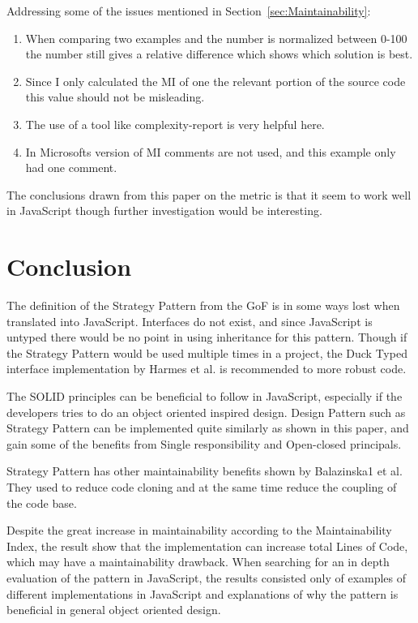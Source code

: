 \documentclass[conference, a4paper]{IEEEtran}
\begin{document}
Addressing some of the issues mentioned in Section~\ref{sec:Maintainability}:
\begin{enumerate}
	\item When comparing two examples and the number is normalized between 0-100 the number still gives a relative difference which shows which solution is best.
	\item Since I only calculated the MI of one the relevant portion of the source code this value should not be misleading.
	\item The use of a tool like complexity-report is very helpful here.
	\item In Microsofts version of MI comments are not used, and this example only had one comment.
\end{enumerate}

The conclusions drawn from this paper on the metric is that it seem to work well in JavaScript though further investigation would be interesting.

\section{Conclusion}
The definition of the Strategy Pattern from the GoF is in some ways lost when translated into JavaScript. Interfaces do not exist, and since JavaScript is untyped there would be no point in using inheritance for this pattern. Though if the Strategy Pattern would be used multiple times in a project, the Duck Typed interface implementation by Harmes et al. is recommended to more robust code.~\cite{bibitem:DiazHarmes}

The SOLID principles can be beneficial to follow in JavaScript, especially if the developers tries to do an object oriented inspired design. Design Pattern such as Strategy Pattern can be implemented quite similarly as shown in this paper, and gain some of the benefits from Single responsibility and Open-closed principals.

Strategy Pattern has other maintainability benefits shown by Balazinska1 et al. They used to reduce code cloning and at the same time reduce the coupling of the code base.~\cite{bibitem:Redesign}

Despite the great increase in maintainability according to the Maintainability Index, the result show that the implementation can increase total Lines of Code, which may have a maintainability drawback. When searching for an in depth evaluation of the pattern in JavaScript, the results consisted only of examples of different implementations in JavaScript and explanations of why the pattern is beneficial in general object oriented design.
\end{document}
